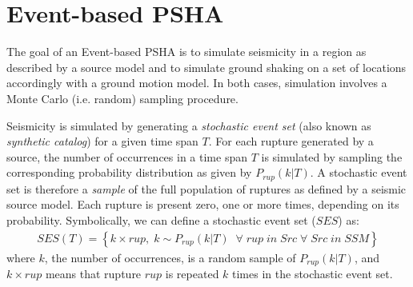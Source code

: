 \section{Event-based PSHA}
\label{sec:event_based}
The goal of an Event-based PSHA is to simulate seismicity in a region as described by a source model
and to simulate ground shaking on a set of locations accordingly with a ground motion model. In both
cases, simulation involves a Monte Carlo (i.e. random) sampling procedure.

Seismicity is simulated by generating a \textit{stochastic event set} (also known as \textit{synthetic catalog})
for a given time span $T$. For each rupture generated by a source,
the number of occurrences in a time span $T$ is simulated by sampling the corresponding probability
distribution as given by $P_{rup}(k | T)$. A stochastic event set is therefore a \textit{sample}
of the full population of ruptures as defined by a seismic source model. Each rupture is present zero, one or
more times, depending on its probability. Symbolically, we can define a stochastic event set ($SES$) as:
\begin{align}
SES(T) = \left\{k \times rup,\;k\sim P_{rup}(k | T)\;\;\forall\;rup\;in\;Src\;\forall\;Src\;in\;SSM\right\}
\end{align}
where $k$, the number of occurrences, is a random sample of $P_{rup}(k | T)$, and $k \times rup$ means
that rupture $rup$ is repeated $k$ times in the stochastic event set.

